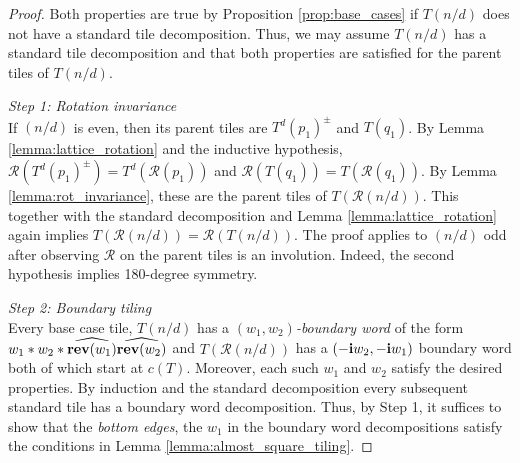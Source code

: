 \documentclass[12pt]{amsart}
\begin{document}
\begin{proof}
	Both properties are true by Proposition \ref{prop:base_cases} if $T(n/d)$ does not have a standard tile decomposition. 
	Thus, we may assume $T(n/d)$ has a standard tile decomposition and that both properties are satisfied for the parent tiles 
	of $T(n/d)$. 
	
	{\it Step 1: Rotation invariance}  \\
	If $(n/d)$ is even, then its parent tiles are $T^d(p_1)^{\pm}$ and $T(q_1)$. By Lemma \ref{lemma:lattice_rotation}
	and the inductive hypothesis, 
	$\mathcal{R}(T^d(p_1)^{\pm}) = T^d(\mathcal{R}(p_1))$ and $\mathcal{R}(T(q_1)) = T(\mathcal{R}(q_1))$. 
	By Lemma \ref{lemma:rot_invariance}, these are the parent tiles of $T(\mathcal{R}(n/d))$.  This together 
	with the standard decomposition and Lemma \ref{lemma:lattice_rotation} again implies $T(\mathcal{R}(n/d)) = \mathcal{R}(T(n/d))$.
	The proof applies to $(n/d)$ odd after observing $\mathcal{R}$ on the parent tiles is an involution. Indeed, the second hypothesis
	implies 180-degree symmetry. 
	
	
	{\it Step 2: Boundary tiling} \\
Every base case tile, $T(n/d)$ has a {\it $(w_1,w_2)$-boundary word} of the form $w_1 * w_2 * \widehat{\mathop{\bf rev}(w_1)} \widehat{\mathop{\bf rev}(w_2)}$ and $T(\mathcal{R}(n/d))$ has a $(-\mathbf{i} w_2, -\mathbf{i} w_1)$ boundary word both of which start at $c(T)$. Moreover, each such $w_1$ and $w_2$ satisfy the desired properties. By induction and the standard decomposition every subsequent standard tile has a boundary word decomposition. 
Thus, by Step 1, it suffices to show that the {\it bottom edges}, the $w_1$ in the boundary word decompositions satisfy the conditions in Lemma \ref{lemma:almost_square_tiling}.


\end{proof}
\end{document}
